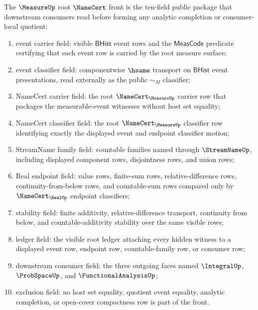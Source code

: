 \begin{definition}
\label{def:measure-root-namecert-front}
The $\MeasureUp$ root $\NameCert$ front is the ten-field public package that
downstream consumers read before forming any analytic completion or
consumer-local quotient:
\begin{enumerate}
  \item event carrier field: visible $\mathsf{BHist}$ event rows and the
  $\mathsf{MeasCode}$ predicate certifying that each event row is carried by
  the root measure surface;
  \item event classifier field: componentwise $\hsame$ transport on
  $\mathsf{BHist}$ event presentations, read externally as the public
  $\sim_M$ classifier;
  \item NameCert carrier field: the root $\NameCert_{\MeasureUp}$ carrier row
  that packages the measurable-event witnesses without host set equality;
  \item NameCert classifier field: the root $\NameCert_{\MeasureUp}$
  classifier row identifying exactly the displayed event and endpoint
  classifier motion;
  \item StreamName family field: countable families named through
  $\StreamNameUp$, including displayed component rows, disjointness rows, and
  union rows;
  \item Real endpoint field: value rows, finite-sum rows, relative-difference
  rows, continuity-from-below rows, and countable-sum rows compared only by
  $\NameCert_{\RealUp}$ endpoint classifiers;
  \item stability field: finite additivity, relative-difference transport,
  continuity from below, and countable-additivity stability over the same
  visible rows;
  \item ledger field: the visible root ledger attaching every hidden witness
  to a displayed event row, endpoint row, countable-family row, or consumer
  row;
  \item downstream consumer field: the three outgoing faces named
  $\IntegralUp$, $\ProbSpaceUp$, and $\FunctionalAnalysisUp$;
  \item exclusion field: no host set equality, quotient event equality,
  analytic completion, or open-cover compactness row is part of the front.
\end{enumerate}
\end{definition}

